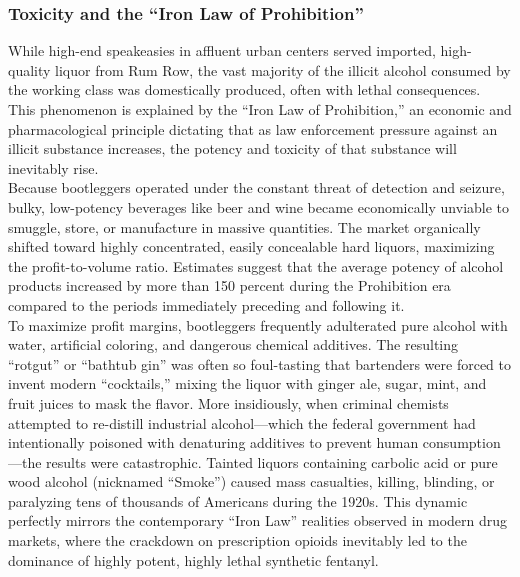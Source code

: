 \documentclass[
]{article}
\begin{document}
\subsubsection {Toxicity and the ``Iron Law of Prohibition''}
While high-end speakeasies in affluent urban centers served imported, high-quality
liquor from Rum Row, the vast majority of the illicit alcohol consumed
by the working class was domestically produced, often with lethal
consequences. This phenomenon is explained by the ``Iron Law of
Prohibition,'' an economic and pharmacological principle dictating that
as law enforcement pressure against an illicit substance increases, the
potency and toxicity of that substance will inevitably rise.\\
Because bootleggers operated under the constant threat of detection and
seizure, bulky, low-potency beverages like beer and wine became
economically unviable to smuggle, store, or manufacture in massive
quantities. The market organically shifted toward highly concentrated,
easily concealable hard liquors, maximizing the profit-to-volume ratio.
Estimates suggest that the average potency of alcohol products increased
by more than 150 percent during the Prohibition era compared to the
periods immediately preceding and following it.\\
To maximize profit margins, bootleggers frequently adulterated pure
alcohol with water, artificial coloring, and dangerous chemical
additives. The resulting ``rotgut'' or ``bathtub gin'' was often so
foul-tasting that bartenders were forced to invent modern ``cocktails,''
mixing the liquor with ginger ale, sugar, mint, and fruit juices to mask
the flavor. More insidiously, when criminal chemists attempted to
re-distill industrial alcohol---which the federal government had
intentionally poisoned with denaturing additives to prevent human
consumption---the results were catastrophic. Tainted liquors containing
carbolic acid or pure wood alcohol (nicknamed ``Smoke'') caused mass
casualties, killing, blinding, or paralyzing tens of thousands of
Americans during the 1920s. This dynamic perfectly mirrors the
contemporary ``Iron Law'' realities observed in modern drug markets,
where the crackdown on prescription opioids inevitably led to the
dominance of highly potent, highly lethal synthetic fentanyl.
\end{document}
